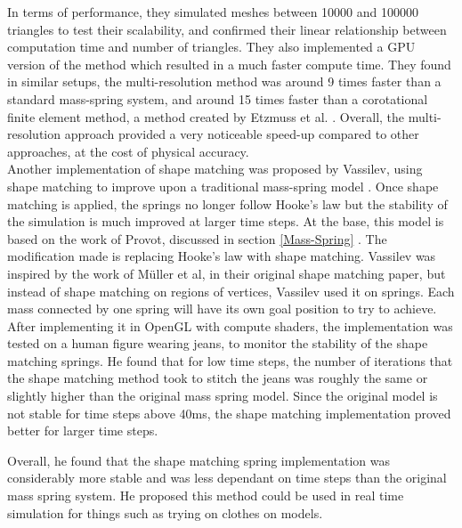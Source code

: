 \documentclass[12pt,a4paper]{article}
\begin{document}
In terms of performance, they simulated meshes between 10000 and 100000 triangles to test their scalability, and confirmed their linear relationship between computation time and number of triangles. They also implemented a GPU version of the method which resulted in a much faster compute time. They found in similar setups, the multi-resolution method was around 9 times faster than a standard mass-spring system, and around 15 times faster than a corotational finite element method, a method created by Etzmuss et al. \cite{etzmuss2003fast}. Overall, the multi-resolution approach provided a very noticeable speed-up compared to other approaches, at the cost of physical accuracy.
\\

Another implementation of shape matching was proposed by Vassilev, using shape matching to improve upon a traditional mass-spring model \cite{shapeMatchingMassSpring}. Once shape matching is applied, the springs no longer follow Hooke's law but the stability of the simulation is much improved at larger time steps. At the base, this model is based on the work of Provot, discussed in section \ref{Mass-Spring} \cite{provot1995deformation}. The modification made is replacing Hooke's law with shape matching. Vassilev was inspired by the work of Müller et al, in their original shape matching paper, but instead of shape matching on regions of vertices, Vassilev used it on springs. Each mass connected by one spring will have its own goal position to try to achieve. \\
After implementing it in OpenGL with compute shaders, the implementation was tested on a human figure wearing jeans, to monitor the stability of the shape matching springs. He found that for low time steps, the number of iterations that the shape matching method took to stitch the jeans was roughly the same or slightly higher than the original mass spring model. Since the original model is not stable for time steps above 40ms, the shape matching implementation proved better for larger time steps.

Overall, he found that the shape matching spring implementation was considerably more stable and was less dependant on time steps than the original mass spring system. He proposed this method could be used in real time simulation for things such as trying on clothes on models.
\end{document}
